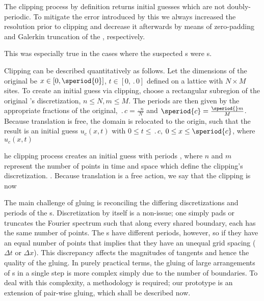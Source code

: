 \begin{description}
{The clipping process by definition returns initial guesses which
are not doubly-periodic. To mitigate the error introduced by this we always
increased the resolution prior to clipping and decrease it afterwards by means
of zero-padding and Galerkin truncation of the {\Fcs}, respectively.

This was especially true in the cases where the suspected
{\fpo}s were {\rpo}s.


Clipping can be described quantitatively as follows.
Let the dimensions of the original {\po} be $x \in [0, \speriod{0}]$,
$t \in [0, \period{0}]$ defined on a {\spt} lattice with $N\times M$ sites.
To create an initial guess via clipping, choose a rectangular subregion of the original {\po}'s discretization,
$n\leq N, m\leq M$. The periods are then given by the appropriate fractions of the original,
$\period{c} = \frac{\period{}n}{N}$ and $\speriod{c} = \frac{\speriod{}m}{M}$.
Because translation is free, the domain is relocated to the origin, such that the result
is an initial guess $u_c(x,t)$ with $0 \leq t \leq \period{c}$, $0 \leq x \leq \speriod{c}$,
where $u_c(x,t)$

he clipping process creates an initial guess with periods , where $n$ and $m$ represent the number of points in time
and space which define the clipping's discretization. . Because translation
is a free action, we say that the clipping is now


The main challenge of gluing is reconciling the differing discretizations and periods
of the {\fpo}s. Discretization by itself is a non-issue; one simply pads or truncates the Fourier
spectrum such that along every shared boundary, each {\fpo} has the same number of points.
The {\fpo}s have different periods, however, so if they have an equal number of points that
implies that they have an unequal grid spacing ($\Delta t$ or $\Delta x$). This discrepancy
affects the magnitudes of tangents and hence the quality of the gluing. In purely
practical terms, the gluing of large arrangements of {\fpo}s in a single step is more
complex simply due to the number of boundaries. To deal with this complexity, a methodology
is required; our prototype is an extension of pair-wise gluing, which shall be described now.

}
\end{description}
